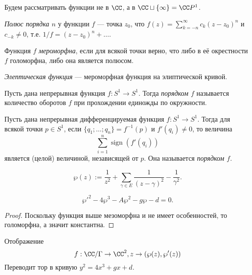\documentclass[12pt,a4paper]{article}
\DeclareMathOperator{\sign}{sign}
\begin{document}
    Будем рассматривать функции не в $\CC$, а в $\CC \sqcup \{\infty\} = \CC P^1$.

    \begin{definition}
        \emph{Полюс порядка $n$} у функции $f$ --- точка $z_0$, что $f(z) = \sum_{k=-n}^\infty c_k (z - z_0)^n$ и $c_{-k} \neq 0$, т.е. $1/f = (z - z_0)^n + \dots$. 
    \end{definition}

    \begin{definition}
        Функция $f$ \emph{мероморфна}, если для всякой точки верно, что либо в её окрестности $f$ голоморфна, либо она является полюсом.
    \end{definition}

    \begin{definition}
        \emph{Элептическая функция} --- мероморфная функция на элиптической кривой.
    \end{definition}

    \begin{definition}
        Пусть дана непрерывная функция $f: S^1 \to S^1$. Тогда \emph{порядком $f$} называется количество оборотов $f$ при прохождении единожды по окружности.
    \end{definition}

    \begin{definition}
        Пусть дана непрерывная дифференцируемая функция $f: S^1 \to S^1$. Тогда для всякой точки $p \in S^1$, 
        если $\{q_1; \dots; q_n\} = f^{-1}(p)$ и $f'(q_i) \neq 0$, то величина
        \[\sum_{i=1}^n \sign(f'(q_i))\]
        является (целой) величиной, независящей от $p$. Она называется \emph{порядком $f$}.
    \end{definition}

    \begin{definition}
        \[\wp(z) := \frac{1}{z^2} + \sum_{\gamma \in E} \frac{1}{(z-\gamma)^2} - \frac{1}{\gamma^2}.\]
    \end{definition}

    \begin{theorem}
        \[\wp'^2 - 4\wp^3 - A\wp^2 - g\wp - d = 0.\]
    \end{theorem}

    \begin{proof}
        Поскольку функция выше мезоморфна и не имеет особенностей, то голоморфна, а значит константна.
    \end{proof}

    \begin{corollary}
        Отображение
        \[f: \CC / \Gamma \to \CC^2, z \to (\wp(z), \wp'(z))\]
        Переводит тор в кривую $y^2 = 4x^3 + g x + d$.
    \end{corollary}

    
\end{document}
